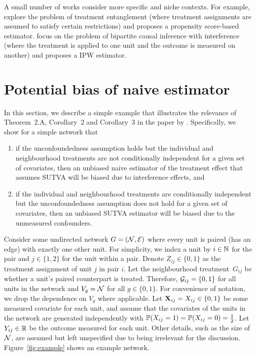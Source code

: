 \documentclass[10pt]{article}
\begin{document}
A small number of works consider more specific and niche contexts. For example, \textcite{Toulis:2018} explore the problem of treatment entanglement (where treatment assignments are assumed to satisfy certain restrictions) and proposes a propensity score-based estimator. \textcite{Zigler:2021} focus on the problem of bipartite causal inference with interference (where the treatment is applied to one unit and the outcome is measured on another) and proposes a IPW estimator.


\section{Potential bias of naive estimator}\label{sec:example}

In this section, we describe a simple example that illustrates the relevance of Theorem~2.A, Corollary~2 and Corollary~3 in the paper by \textcite{Forastiere:2021}. Specifically, we show for a simple network that
\begin{enumerate}

\item
if the unconfoundedness assumption holds but the individual and neighbourhood treatments are not conditionally independent for a given set of covariates, then an unbiased naive estimator of the treatment effect that assumes SUTVA will be biased due to interference effects, and

\item
if the individual and neighbourhood treatments are conditionally independent but the unconfoundedness assumption does not hold for a given set of covariates, then an unbiased SUTVA estimator will be biased due to the unmeasured confounders.

\end{enumerate}

Consider some undirected network $G=(\calN,\calE)$ where every unit is paired (has an edge) with exactly one other unit. For simplicity, we index a unit by $i\in\bbN$ for the pair and $j\in\{1,2\}$ for the unit within a pair. Denote $Z_{ij}\in\{0,1\}$ as the treatment assignment of unit $j$ in pair $i$. Let the neighbourhood treatment~$G_{ij}$ be whether a unit's paired counterpart is treated. Therefore, $\calG_{ij}=\{0,1\}$ for all units in the network and $V_g=\calN$ for all $g\in\{0,1\}$. For convenience of notation, we drop the dependence on $V_g$ where applicable. Let $\bfX_{ij}=X_{ij}\in\{0,1\}$ be some measured covariate for each unit, and assume that the covariates of the units in the network are generated independently with $\P(X_{ij}=1)=\P(X_{ij}=0)=\frac{1}{2}$. Let $Y_{ij}\in\bbR$ be the outcome measured for each unit. Other details, such as the size of $\calN$, are assumed but left unspecified due to being irrelevant for the discussion. Figure~\ref{fig:example} shows an example network.
\\
\end{document}
